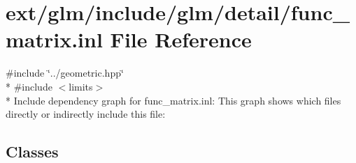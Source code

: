 \hypertarget{func__matrix_8inl}{\section{ext/glm/include/glm/detail/func\-\_\-matrix.inl File Reference}
\label{func__matrix_8inl}
}
{\ttfamily \#include \char`\"{}../geometric.\-hpp\char`\"{}}\\*
{\ttfamily \#include $<$limits$>$}\\*
Include dependency graph for func\-\_\-matrix.\-inl\-:
This graph shows which files directly or indirectly include this file\-:
\subsection*{Classes}
